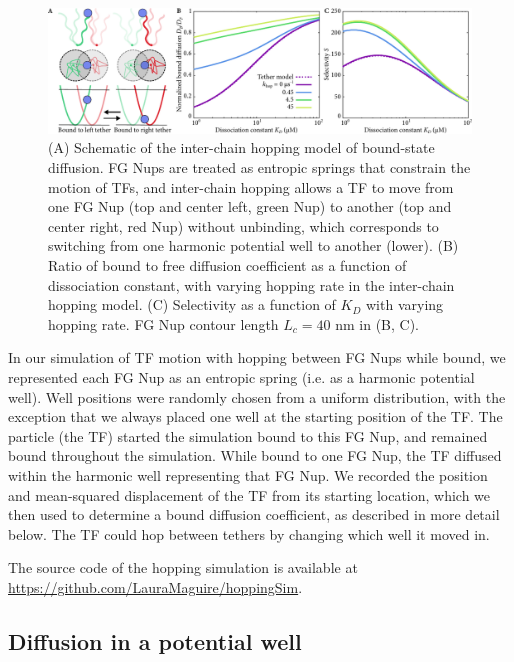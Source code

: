 \begin{figure}
\centering
\includegraphics[width = \textwidth]{figs/ch02/fig4.pdf}
\caption[Selectivity from inter-chain hopping.]{(A) Schematic of the inter-chain hopping model of bound-state diffusion. FG Nups are treated as entropic springs that constrain the motion of TFs, and inter-chain hopping allows a TF to move from one FG Nup (top and center left, green Nup) to another (top and center right, red Nup) without unbinding, which corresponds to switching from one harmonic potential well to another (lower). (B) Ratio of bound to free diffusion coefficient as a function of dissociation constant, with varying hopping rate in the inter-chain hopping model.  (C) Selectivity as a function of $K_D$ with varying hopping rate. FG Nup contour length $L_c = 40$ nm in (B, C). }
\label{fig:hopping}
\end{figure}

In our simulation of TF motion with hopping between FG Nups while bound, we represented each FG Nup as an entropic spring (i.e. as a harmonic potential well).  Well positions were randomly chosen from a uniform distribution, with the exception that we always placed one well at the starting position of the TF.  The particle (the TF) started the simulation bound to this FG Nup, and remained bound throughout the simulation.  While bound to one FG Nup, the TF diffused within the harmonic well representing that FG Nup. We recorded the position and mean-squared displacement of the TF from its starting location, which we then used to determine a bound diffusion coefficient, as described in more detail below.  The TF could hop between tethers by changing which well it moved in.

The source code of the hopping simulation is available at \url{https://github.com/LauraMaguire/hoppingSim}.

\subsection{Diffusion in a potential well}

